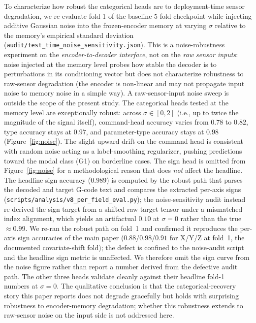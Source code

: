 \documentclass[11pt,a4paper]{article}
\begin{document}
To characterize how robust the categorical heads are to deployment-time sensor degradation, we re-evaluate fold 1 of the baseline 5-fold checkpoint while injecting additive Gaussian noise into the frozen-encoder memory at varying $\sigma$ relative to the memory's empirical standard deviation (\texttt{audit/test\_time\_noise\_sensitivity.json}). This is a noise-robustness experiment on the \emph{encoder-to-decoder interface}, not on the \emph{raw sensor inputs}: noise injected at the memory level probes how stable the decoder is to perturbations in its conditioning vector but does not characterize robustness to raw-sensor degradation (the encoder is non-linear and may not propagate input noise to memory noise in a simple way). A raw-sensor-input noise sweep is outside the scope of the present study. The categorical heads tested at the memory level are exceptionally robust: across $\sigma \in [0, 2]$ (i.e., up to twice the magnitude of the signal itself), command-head accuracy varies from $0.78$ to $0.82$, type accuracy stays at $0.97$, and parameter-type accuracy stays at $0.98$ (Figure~\ref{fig:noise}). The slight upward drift on the command head is consistent with random noise acting as a label-smoothing regularizer, pushing predictions toward the modal class (G1) on borderline cases. The sign head is omitted from Figure~\ref{fig:noise} for a methodological reason that does \emph{not} affect the headline. The headline sign accuracy ($0.989$) is computed by the robust path that parses the decoded and target G-code text and compares the extracted per-axis signs (\texttt{scripts/analysis/v8\_per\_field\_eval.py}); the noise-sensitivity audit instead re-derived the sign target from a shifted raw target tensor under a mismatched index alignment, which yields an artifactual $0.10$ at $\sigma=0$ rather than the true $\approx\!0.99$. We re-ran the robust path on fold~1 and confirmed it reproduces the per-axis sign accuracies of the main paper ($0.88$/$0.98$/$0.91$ for X/Y/Z at fold~1, the documented covariate-shift fold); the defect is confined to the noise-audit script and the headline sign metric is unaffected. We therefore omit the sign curve from the noise figure rather than report a number derived from the defective audit path. The other three heads validate cleanly against their headline fold-1 numbers at $\sigma=0$. The qualitative conclusion is that the categorical-recovery story this paper reports does not degrade gracefully but holds with surprising robustness to encoder-memory degradation; whether this robustness extends to raw-sensor noise on the input side is not addressed here.
\end{document}
